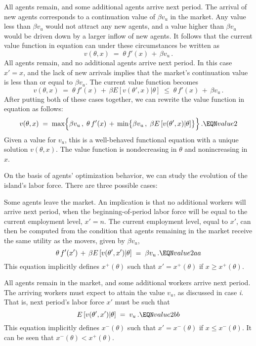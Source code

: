 \medskip
{} All agents remain, and some additional agents arrive
next period. The arrival of new agents corresponds to a continuation
value of $\beta v_u$ in the market. Any value less than $\beta v_u$ would not
attract any new agents, and a value higher than $\beta v_u$ would be driven
down by a larger inflow of new agents. It follows that the current
value function in equation  can under these circumstances
be written as
$$v(\theta, x) \;=\; \theta \, f'(x) \,+\, \beta v_u \,.
$$
\medskip
{} All agents remain, and no additional agents arrive
next period. In this case $x' = x$, and the lack of new arrivals
implies that the market's continuation value is less than or equal to
$\beta v_u$. The current value function becomes
$$v(\theta, x) \;=\; \theta \, f'(x) \,+\,
   \beta E\left[v(\theta',x) \vert \theta \right] \;\leq\;
                      \theta \, f'(x) \,+\, \beta v_u \,.
$$
\medskip
After putting both of these cases together, we can rewrite the value
function in equation  as follows:
$$v(\theta, x) \;=\; \max \Bigl\{\beta v_u\,,\; \theta \, f'(x) \,+\,
  \min \bigl\{ \beta v_u\,,\; \beta E\left[v(\theta',x) \vert \theta \right]
      \bigr\} \Bigr\}\,. \EQN value2
$$
Given a value for $v_u$, this is a well-behaved functional equation
with a unique solution $v(\theta, x)$. The value function is
nondecreasing in $\theta$ and nonincreasing in $x$.

On the basis of agents' optimization behavior, we can study the
evolution of the island's
labor force. There are three possible cases:

\medskip
{} Some agents leave the market. An implication is
that no
additional workers will arrive next period, when the beginning-of-period
labor force will be equal to the current employment level,
$x'=n$. The current employment level, equal to  $x'$, can then be computed from
the condition that agents remaining in the market receive the same
utility as the movers, given by $\beta v_u$,
$$\theta \, f'(x') \,+\, \beta E\left[v(\theta',x') \vert \theta \right]
      \;=\; \beta v_u \,.                                 \EQN value2aa
$$
This equation implicitly defines $x^+(\theta)$ such that
$x'=x^+(\theta)$ if $x\geq x^+(\theta)$.

\medskip
{} All agents remain in the market, and some additional
workers arrive next period. The arriving workers must expect to attain the
value $v_u$, as discussed in case {\it i}. That is, next period's
labor force $x'$ must be such that
$$ E\left[v(\theta',x') \vert \theta \right]
      \;=\; v_u \,.                                  \EQN value2bb
$$
This equation implicitly defines $x^-(\theta)$ such that
$x'=x^-(\theta)$ if $x\leq x^-(\theta)$. It can be seen that
$x^-(\theta) < x^+(\theta)$.

